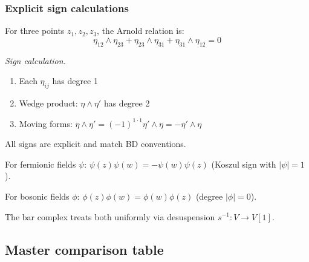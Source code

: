 \subsubsection{Explicit sign calculations}

\begin{example}\label{ex:arnold-sign-explicit-dict}
For three points $z_1, z_2, z_3$, the Arnold relation is:
\[\eta_{12} \wedge \eta_{23} + \eta_{23} \wedge \eta_{31} + \eta_{31} \wedge \eta_{12} = 0\]

\emph{Sign calculation.}
\begin{enumerate}
\item Each $\eta_{ij}$ has degree 1
\item Wedge product: $\eta \wedge \eta'$ has degree 2
\item Moving forms: $\eta \wedge \eta' = (-1)^{1 \cdot 1} \eta' \wedge \eta = -\eta' \wedge \eta$
\end{enumerate}

All signs are explicit and match BD conventions.
\end{example}

\begin{remark}\label{rem:fermionic-bosonic-signs-dict}
For fermionic fields $\psi$: $\psi(z)\psi(w) = -\psi(w)\psi(z)$ (Koszul sign with $|\psi| = 1$).

For bosonic fields $\phi$: $\phi(z)\phi(w) = \phi(w)\phi(z)$ (degree $|\phi| = 0$).

The bar complex treats both uniformly via desuspension $s^{-1}: V \to V[1]$.
\end{remark}


\subsection{Master comparison table}
\label{sec:master-comparison-signs}

